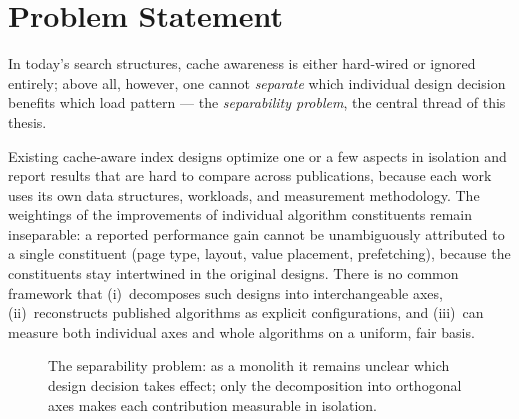 \section{Problem Statement}\label{sec:problem}
In today's search structures, cache awareness is either hard-wired or ignored entirely; above all, however,
one cannot \emph{separate} which individual design decision benefits which load pattern --- the
\emph{separability problem}, the central thread of this thesis.

Existing cache-aware index designs optimize one or a few aspects in isolation and report results that
are hard to compare across publications, because each work uses its own data structures, workloads, and
measurement methodology. The weightings of the improvements of individual algorithm constituents remain
inseparable: a reported performance gain cannot be unambiguously attributed to a single constituent
(page type, layout, value placement, prefetching), because the constituents stay intertwined in the
original designs. There is no common framework that (i)~decomposes such designs into interchangeable
axes, (ii)~reconstructs published algorithms as explicit configurations, and (iii)~can measure both
individual axes and whole algorithms on a uniform, fair basis.

\begin{figure}[htbp]\centering
{}
\caption{The separability problem: as a monolith it remains unclear which design decision takes effect; only the decomposition into orthogonal axes makes each contribution measurable in isolation.}\label{fig:separability}
\end{figure}

